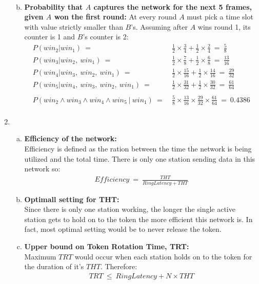 \documentclass[11pt]{article}
\begin{document}
\begin{enumerate}[1.]
\begin{enumerate}[(a)]
\begin{align*}
    \end{align*}
  \item \textbf{Probability that $A$ captures the network for the next 5 frames, given $A$ won the first round:}
  At every round $A$ must pick a time slot with value strictly smaller than $B$'s. Assuming after $A$ wins round 1, its counter is 1 and $B$'s counter is 2:
  \begin{align*}
    P(win_2 | win_1) \ =&\ \frac{1}{2}\times\frac{3}{4} + \frac{1}{2}\times\frac{2}{4} \ =\ \frac{5}{8} \\
    P(win_3 | win_2,\ win_1) \ =&\ \frac{1}{2}\times\frac{7}{8} + \frac{1}{2}\times\frac{6}{8} \ =\ \frac{13}{16} \\
    P(win_4 | win_3,\ win_2,\ win_1) \ =&\ \frac{1}{2}\times\frac{15}{16} + \frac{1}{2}\times\frac{14}{16} \ =\ \frac{29}{32}\\
    P(win_5 | win_4,\ win_3,\ win_2,\ win_1) \ =&\ \frac{1}{2}\times\frac{31}{32} + \frac{1}{2}\times\frac{30}{32} \ =\ \frac{61}{64}\\ \\
    P(win_2 \land win_3 \land win_4 \land win_5\ |\ win_1)\ =&\ \frac{5}{8} \times \frac{13}{16} \times \frac{29}{32} \times \frac{61}{64} \ =\ 0.4386\\
  \end{align*}
  \end{enumerate}
\item %
  \begin{enumerate}[(a)]
    \item \textbf{Efficiency of the network:} \\
    Efficiency is defined as the ration between the time the network is being utilized and the total time. There is only one station sending data in this network so:
    \begin{align*}
      Efficiency \ =\ \frac{THT}{RingLatency + THT}
    \end{align*}
    \item \textbf{Optimall setting for THT:} \\
    Since there is only one station working, the longer the single active station gets to hold on to the token the more efficient this network is. In fact, most optimal setting would be to never release the token.
    \item \textbf{Upper bound on Token Rotation Time, TRT:} \\
    Maximum $TRT$ would occur when each station holds on to the token for the duration of it's $THT$. Therefore:
    \begin{align*}
      TRT\ \leq\ RingLatency + N \times THT
    \end{align*}
    
  \end{enumerate}
\end{enumerate}
\end{document}

